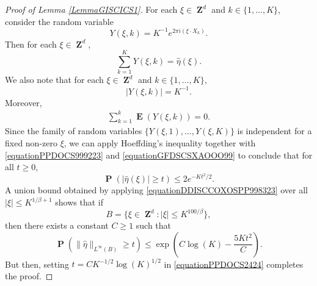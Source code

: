 \documentclass[12pt,reqno]{article}
\numberwithin{equation}{section}
\DeclareMathOperator{\ZZ}{\mathbf{Z}}
\numberwithin{theorem}{section}
\DeclareMathOperator{\EE}{\mathbf{E}}
\DeclareMathOperator{\PP}{\mathbf{P}}
\begin{document}
\begin{proof}[Proof of Lemma \ref{LemmaGISCICS1}]
    For each $\xi \in \ZZ^d$ and $k \in \{ 1, \dots, K \}$, consider the random variable
    \begin{equation}
        Y(\xi,k) = K^{-1} e^{2 \pi i (\xi \cdot X_k)}.
    \end{equation}
    Then for each $\xi \in \ZZ^d$,
    \begin{equation} \label{equationPPDOCS999223}
        \sum_{k = 1}^K Y(\xi,k) = \widehat{\eta}(\xi).
    \end{equation}
    We also note that for each $\xi \in \ZZ^d$ and $k \in \{ 1, \dots, K \}$,
    \begin{equation} \label{equationGFDSCSXAOOO99}
        |Y(\xi,k)| = K^{-1}.
    \end{equation}
    Moreover,
    \begin{equation} \label{equationDOIJWIJCCCCC5555322}
    \begin{split}
        \sum_{k = 1}^k \EE(Y(\xi,k)) = 0.
    \end{split}
    \end{equation}
    Since the family of random variables $\{ Y(\xi,1), \dots, Y(\xi,K) \}$ is independent for a fixed non-zero $\xi$, we can apply Hoeffding's inequality together with \eqref{equationPPDOCS999223} and \eqref{equationGFDSCSXAOOO99} to conclude that for all $t \geq 0$,
    \begin{equation} \label{equationDDISCCOXOSPP998323}
        \PP \left( |\widehat{\eta}(\xi)| \geq t \right) \leq 2 e^{-Kt^2/2}.
    \end{equation}
    A union bound obtained by applying \eqref{equationDDISCCOXOSPP998323} over all $|\xi| \leq K^{1/\beta+1}$ shows that if
    \[ B = \{ \xi \in \ZZ^d : |\xi| \leq K^{100/\beta} \}, \]
    then there exists a constant $C \geq 1$ such that %
    \begin{equation} \label{equationPPDOCS2424}
        \PP \left( \| \widehat{\eta} \|_{L^\infty(B)} \geq t \right) \leq \exp \left( C \log(K) - \frac{5K t^2}{C} \right).
    \end{equation}
    But then, setting $t = CK^{-1/2} \log(K)^{1/2}$ in \eqref{equationPPDOCS2424} completes the proof.
\end{proof}
\end{document}
